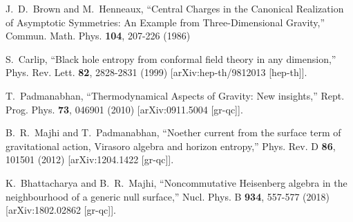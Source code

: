 \documentclass[prd, preprint, longbibliography, 11pt]{revtex4-1}
\begin{document}
\begin{thebibliography}{9}
J.~D.~Brown and M.~Henneaux,
``Central Charges in the Canonical Realization of Asymptotic Symmetries: An Example from Three-Dimensional Gravity,''
Commun. Math. Phys. \textbf{104}, 207-226 (1986)

S.~Carlip,
``Black hole entropy from conformal field theory in any dimension,''
Phys. Rev. Lett. \textbf{82}, 2828-2831 (1999)
[arXiv:hep-th/9812013 [hep-th]].

T.~Padmanabhan,
``Thermodynamical Aspects of Gravity: New insights,''
Rept. Prog. Phys. \textbf{73}, 046901 (2010)
[arXiv:0911.5004 [gr-qc]].

B.~R.~Majhi and T.~Padmanabhan,
``Noether current from the surface term of gravitational action, Virasoro algebra and horizon entropy,''
Phys. Rev. D \textbf{86}, 101501 (2012)
[arXiv:1204.1422 [gr-qc]].

K.~Bhattacharya and B.~R.~Majhi,
``Noncommutative Heisenberg algebra in the neighbourhood of a generic null surface,''
Nucl. Phys. B \textbf{934}, 557-577 (2018)
[arXiv:1802.02862 [gr-qc]].

\end{thebibliography}



\end{document}
